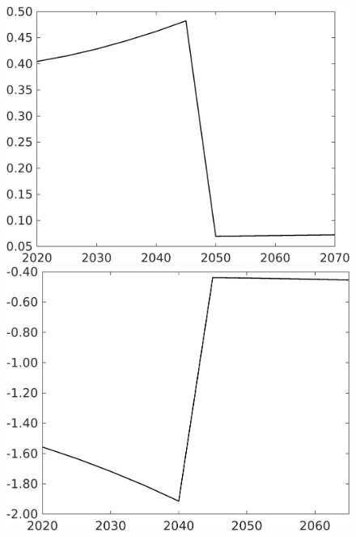\begin{figure}[h!!!]
\begin{minipage}[]{0.32\textwidth}
\end{minipage}
	\begin{minipage}[]{0.32\textwidth}
		\includegraphics[width=1\textwidth]{../../codding_model/own_basedOnFried/optimalPol_010922_revision/figures/all_13Sept22_Tplus30/tauf_OPT_COMPtaulPer_regime4_spillover0_knspil1_noskill1_sep0_xgrowth0_PV1_etaa0.79.png}
	\end{minipage}
	\begin{minipage}[]{0.32\textwidth}
		\includegraphics[width=1\textwidth]{../../codding_model/own_basedOnFried/optimalPol_010922_revision/figures/all_13Sept22_Tplus30/gAf_OPT_COMPtaulPer_regime4_spillover0_knspil1_noskill1_sep0_xgrowth0_PV1_etaa0.79.png}

\end{minipage}
\end{figure}
